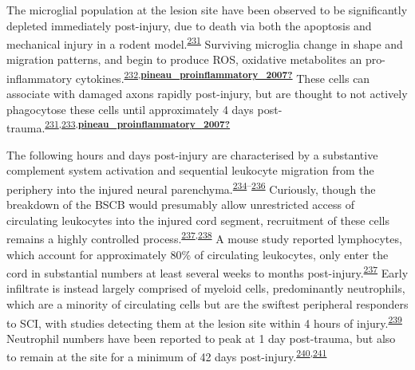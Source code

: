 \documentclass[
]{article}
\begin{document}
The microglial population at the lesion site have been observed to be significantly depleted immediately post-injury, due to death via both the apoptosis and mechanical injury in a rodent model.\textsuperscript{\protect\hyperlink{ref-bellver-landete_microglia_2019}{231}}
Surviving microglia change in shape and migration patterns, and begin to produce ROS, oxidative metabolites an pro-inflammatory cytokines.\textsuperscript{\protect\hyperlink{ref-bastien_cytokine_2014}{232},\protect\hyperlink{ref-pineau_proinflammatory_2007}{\textbf{pineau\_proinflammatory\_2007?}}}
These cells can associate with damaged axons rapidly post-injury, but are thought to not actively phagocytose these cells until approximately 4 days post-trauma.\textsuperscript{\protect\hyperlink{ref-bellver-landete_microglia_2019}{231},\protect\hyperlink{ref-greenhalgh_differences_2014}{233},\protect\hyperlink{ref-pineau_proinflammatory_2007}{\textbf{pineau\_proinflammatory\_2007?}}}

The following hours and days post-injury are characterised by a substantive complement system activation and sequential leukocyte migration from the periphery into the injured neural parenchyma.\textsuperscript{\protect\hyperlink{ref-brennan_complement_2015}{234}--\protect\hyperlink{ref-qiao_complement_2006}{236}}
Curiously, though the breakdown of the BSCB would presumably allow unrestricted access of circulating leukocytes into the injured cord segment, recruitment of these cells remains a highly controlled process.\textsuperscript{\protect\hyperlink{ref-beck_quantitative_2010}{237},\protect\hyperlink{ref-brennan_complement_2019}{238}}
A mouse study reported lymphocytes, which account for approximately 80\% of circulating leukocytes, only enter the cord in substantial numbers at least several weeks to months post-injury.\textsuperscript{\protect\hyperlink{ref-beck_quantitative_2010}{237}}
Early infiltrate is instead largely comprised of myeloid cells, predominantly neutrophils, which are a minority of circulating cells but are the swiftest peripheral responders to SCI, with studies detecting them at the lesion site within 4 hours of injury.\textsuperscript{\protect\hyperlink{ref-wright_neutrophil_2010}{239}}
Neutrophil numbers have been reported to peak at 1 day post-trauma, but also to remain at the site for a minimum of 42 days post-injury.\textsuperscript{\protect\hyperlink{ref-okada_pathophysiological_2016}{240},\protect\hyperlink{ref-kigerl_comparative_2006}{241}}
\end{document}
